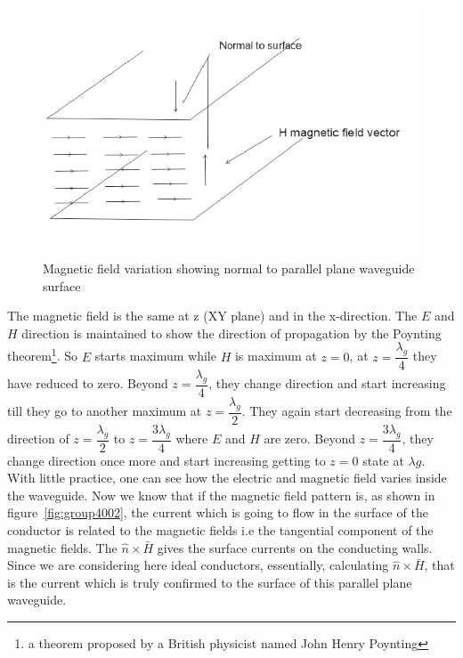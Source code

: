 \begin{figure}[h]
\centering
\includegraphics[width=.7\linewidth]{./graphics/page703}
\caption{Magnetic field variation showing normal to parallel plane waveguide surface}
\label{fig:page703}
\end{figure}

The magnetic field is the same at z (XY plane) and in the x-direction. The $E$ and $H$ direction is maintained to show the direction of propagation by the Poynting theorem\footnote{a theorem proposed by a British physicist named John Henry Poynting}. So $E$ starts maximum while $H$ is maximum at $z=0$, at ${z= \dfrac{\lambda_g}{4}}$ they have reduced to zero. Beyond ${z= \dfrac{\lambda_g}{4}}$, they change direction and start increasing till they go to another maximum at ${z=\dfrac{\lambda_g}{2}}$. They again start decreasing from the direction of ${z=\dfrac{\lambda_g}{2}}$ to ${z=\dfrac{3\lambda_g}{4}}$ where $E$ and $H$ are zero. Beyond ${z=\dfrac{3\lambda_g}{4}}$,  they change direction once more and start increasing getting to $z=0$ state at ${\lambda g}$. With little practice, one can see how the electric and magnetic field varies inside the waveguide. Now we know that if the magnetic field pattern is, as shown in figure~\ref{fig:group4002}, the current which is going to flow in the surface of the conductor is related to the magnetic fields i.e the tangential component of the magnetic fields. The ${\hat{n}\times\bar{H}}$ gives the surface currents on the conducting walls. Since we are considering here ideal conductors, essentially, calculating ${\hat{n}\times\bar{H}}$, that is the current which is truly confirmed to the surface of this parallel plane waveguide. 

